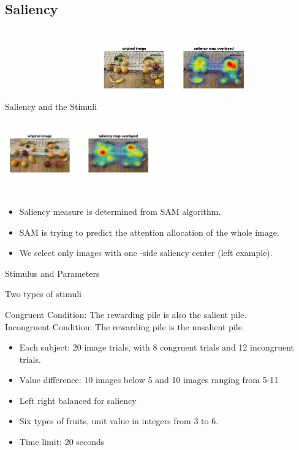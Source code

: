 \documentclass[UKenglish, aspectratio = 169]{beamer}
\begin{document}
\subsection{Saliency}

\begin{frame}{Saliency and the Stimuli}
\center
\includegraphics[width=0.48\textwidth,height=3.5cm]{images/heatmap_many2.jpg}
\includegraphics[width=0.48\textwidth,height=3.5cm]{images/twoCenterHeatmap.png}
\begin{itemize}
	\item Saliency measure is determined from SAM algorithm.
	\item SAM is trying to predict the attention allocation of the whole image.
	\item We select only images with one -side saliency center (left example). 
\end{itemize}
\end{frame}


\begin{frame}{Stimulus and Parameters}
	\begin{alertblock}{Two types of stimuli}
		
		\alert{Congruent Condition}: The rewarding pile is also the salient pile.\\
		\alert{Incongruent Condition}: The rewarding pile is the unsalient pile.		
	\end{alertblock}

\begin{itemize}
	\item Each subject: 20 image trials, with 8 congruent trials and 12 incongruent trials. 
	\item Value difference: 10 images below 5 and 10 images ranging from 5-11
	\item Left right balanced for saliency 
	\item Six types of fruits, unit value in integers from 3 to 6.
	\item Time limit: 20 seconds
\end{itemize}
\end{frame}
\end{document}
